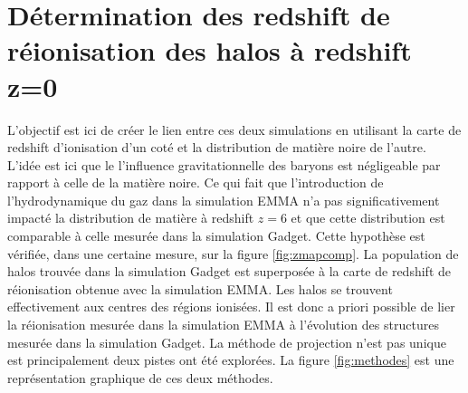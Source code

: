 \section{Détermination des redshift de réionisation des halos à redshift z=0}

L'objectif est ici de créer le lien entre ces deux simulations en utilisant la carte de redshift d'ionisation d'un coté et la distribution de matière noire de l'autre.
L'idée est ici que le l'influence gravitationnelle des baryons est négligeable par rapport à celle de la matière noire.
Ce qui fait que l'introduction de l'hydrodynamique du gaz dans la simulation EMMA n'a pas significativement impacté la distribution de matière à redshift $z=6$ et que cette distribution est comparable à celle mesurée dans la simulation Gadget.
Cette hypothèse est vérifiée, dans une certaine mesure, sur la figure \ref{fig:zmapcomp}.
La population de halos trouvée dans la simulation Gadget est superposée à la carte de redshift de réionisation obtenue avec la simulation EMMA.
Les halos se trouvent effectivement aux centres des régions ionisées.
Il est donc a priori possible de lier la réionisation mesurée dans la simulation EMMA à l'évolution des structures mesurée dans la simulation Gadget.
La méthode de projection n'est pas unique est principalement deux pistes ont été explorées.
La figure \ref{fig:methodes} est une représentation graphique de ces deux méthodes.


